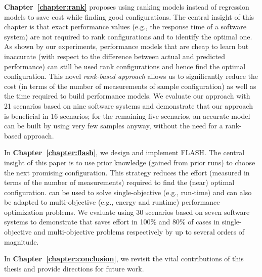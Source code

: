 \textbf{Chapter~\ref{chapter:rank}} proposes using ranking models instead of regression models to save cost while finding good configurations. The central insight of this chapter is that exact performance values (e.g., the response time of a software system) are not required to rank configurations and to identify the optimal one. 
As shown by our experiments, performance models that are cheap to learn but inaccurate (with respect to the difference between actual and predicted performance) can still be used rank configurations and hence find the optimal configuration. This novel \emph{rank-based approach} allows us to significantly reduce the cost (in terms of the number of measurements of sample configuration) as well as the time required to build performance models. We evaluate our approach with 21 scenarios based on nine software systems and demonstrate that our approach is beneficial in 16 scenarios; for the remaining five scenarios, an accurate model can be built by using very few samples anyway, without the need for a rank-based approach.

In \textbf{Chapter~\ref{chapter:flash}}, we design and implement FLASH. The central insight of this paper is to use prior knowledge (gained from prior runs) to choose the next promising configuration. This strategy reduces the effort (measured in terms of the number of measurements) required to find the (near) optimal configuration.  \flash can be used to solve single-objective (e.g., run-time) and can also be adapted to multi-objective (e.g., energy and runtime) performance optimization problems. 
We evaluate \flash using 30 scenarios based on seven software systems to demonstrate that \flash saves effort in 100\% and 80\% of cases in single-objective and multi-objective problems respectively by up to several orders of magnitude. 

In \textbf{Chapter~\ref{chapter:conclusion}}, we revisit the vital contributions of this thesis and provide directions for future work.